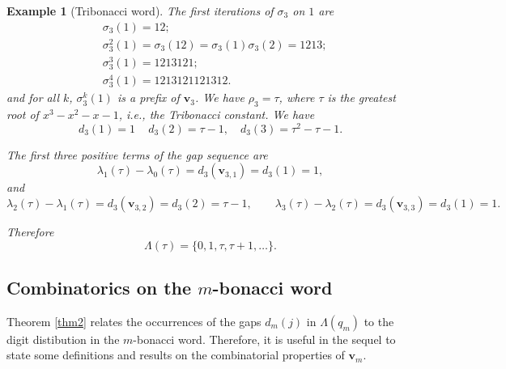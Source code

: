 \documentclass{amsart}
\newtheorem{example}[theorem]{Example}
\begin{document}
\begin{example}[Tribonacci word]
The first iterations of $\sigma_3$ on $1$ are
\begin{align*}
&\sigma_3(1)=12;\\
&\sigma_3^2(1)=\sigma_3(12)=\sigma_3(1)\sigma_3(2)=1213;\\
&\sigma_3^3(1)=1213121;\\
&\sigma_3^4(1)=1213121121312. \end{align*}
and for all $k$, $\sigma_3^k(1)$ is a prefix of $\mathbf v_3$. We have $\rho_3=\tau$, where $\tau$ is the greatest root of $x^3-x^2-x-1$, i.e., the Tribonacci constant. We have
$$d_3(1)=1\,\quad d_3(2)= \tau-1,   \quad d_3(3)=\tau^2-\tau-1.$$


The first three positive terms of the gap sequence are
\[
\lambda_1(\tau)-\lambda_0(\tau)
=
d_3(\mathbf v_{3,1})
=
d_3(1)
=
1,
\]
and
\[
\lambda_2(\tau)-\lambda_1(\tau)
=
d_3(\mathbf v_{3,2})
=
d_3(2)
=
\tau-1,
\qquad
\lambda_3(\tau)-\lambda_2(\tau)
=
d_3(\mathbf v_{3,3})
=
d_3(1)
=
1.
\]

Therefore
\[
\Lambda(\tau)
=
\{0,1,\tau,\tau+1,\dots\}.
\]
\end{example}


\subsection{Combinatorics on the $m$-bonacci word}
Theorem \ref{thm2} relates the occurrences of the gaps $d_m(j)$ in $\Lambda(q_m)$ to the digit distibution in the $m$-bonacci word. Therefore, it is useful in the sequel to state some definitions and results on the combinatorial properties of $\mathbf v_m$.
\end{document}

